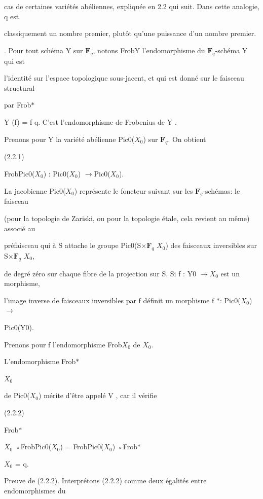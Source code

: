 \documentclass[11pt]{article}
\begin{document}
\noindent cas de certaines variétés abéliennes, expliquée en 2.2 qui suit. Dans cette analogie, q est\par
\noindent classiquement un nombre premier, plutôt qu’une puissance d’un nombre premier.\par
{}. Pour tout schéma Y sur \(\mathbf F_q\), notons FrobY l’endomorphisme du \(\mathbf F_q\)-schéma Y qui est\par
\noindent l’identité sur l’espace topologique sous-jacent, et qui est donné sur le faisceau structural\par
\noindent par Frob\(*\)\par
\noindent Y (f) = f q. C’est l’endomorphisme de Frobenius de Y .\par
\noindent Prenons pour Y la variété abélienne Pic0(\(X_0\)) sur \(\mathbf F_q\). On obtient\par
\noindent (2.2.1)\par
\noindent FrobPic0(\(X_0\)) : Pic0(\(X_0\)) \(\to\)Pic0(\(X_0\)).\par
\noindent La jacobienne Pic0(\(X_0\)) représente le foncteur suivant sur les \(\mathbf F_q\)-schémas: le faisceau\par
\noindent (pour la topologie de Zariski, ou pour la topologie étale, cela revient au même) associé au\par
\noindent préfaisceau qui à S attache le groupe Pic0(S×\(\mathbf F_q\) \(X_0\)) des faisceaux inversibles sur S×\(\mathbf F_q\) \(X_0\),\par
\noindent de degré zéro sur chaque fibre de la projection sur S. Si f : Y0 \(\to\)\(X_0\) est un morphisme,\par
\noindent l’image inverse de faisceaux inversibles par f définit un morphisme f \(*\): Pic0(\(X_0\)) \(\to\)\par
\noindent Pic0(Y0).\par
\noindent Prenons pour f l’endomorphisme Frob\(X_0\) de \(X_0\).\par
\noindent L’endomorphisme Frob\(*\)\par
\noindent \(X_0\)\par
\noindent de Pic0(\(X_0\)) mérite d’être appelé V , car il vérifie\par
\noindent (2.2.2)\par
\noindent Frob\(*\)\par
\noindent \(X_0\) ◦FrobPic0(\(X_0\)) = FrobPic0(\(X_0\)) ◦Frob\(*\)\par
\noindent \(X_0\) = q.\par
\noindent Preuve de (2.2.2). Interprétons (2.2.2) comme deux égalités entre endomorphismes du\par
\end{document}
